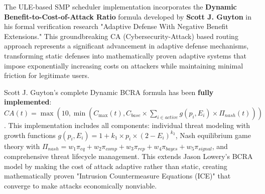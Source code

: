 \documentclass[11pt,a4paper]{article}
\begin{document}
The ULE-based SMP scheduler implementation incorporates the \textbf{Dynamic Benefit-to-Cost-of-Attack Ratio} formula developed by \textbf{Scott J. Guyton} in his formal verification research "Adaptive Defense With Negative Benefit Extensions." This groundbreaking CA (Cybersecurity-Attack) based routing approach represents a significant advancement in adaptive defense mechanisms, transforming static defenses into mathematically proven adaptive systems that impose exponentially increasing costs on attackers while maintaining minimal friction for legitimate users.

Scott J. Guyton's complete Dynamic BCRA formula has been \textbf{fully implemented}: $CA(t) = \max(10, \min(C_{\max}(t), C_{base} \times \sum_{i \in active} g(p_i, E_i) \times \Pi_{nash}(t)))$. This implementation includes all components: individual threat modeling with growth functions $g(p_i, E_i) = 1 + k_1 \times p_i \times (2 - E_i)^{k_2}$, Nash equilibrium game theory with $\Pi_{nash} = w_1\pi_{eq} + w_2\pi_{comp} + w_3\pi_{rep} + w_4\pi_{bayes} + w_5\pi_{signal}$, and comprehensive threat lifecycle management. This extends Jason Lowery's BCRA model by making the cost of attack adaptive rather than static, creating mathematically proven "Intrusion Countermeasure Equations (ICE)" that converge to make attacks economically nonviable.
\end{document}
